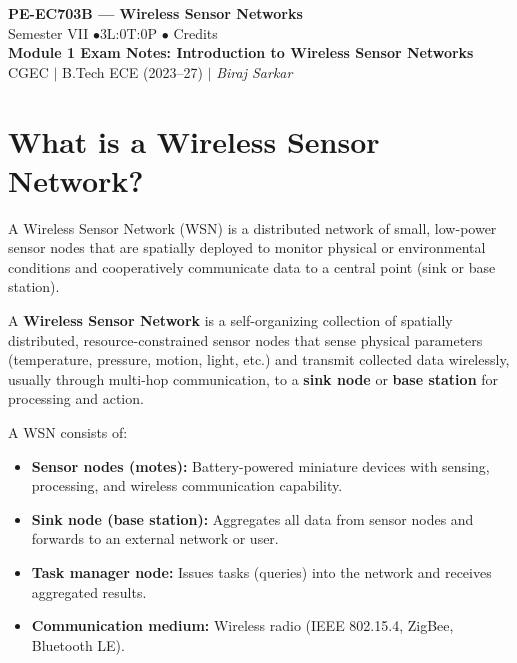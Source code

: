 \documentclass[12pt,a4paper]{article}
\begin{document}

\begin{center}
  {\LARGE\bfseries\color{myred} PE-EC703B --- Wireless Sensor Networks}\\[5pt]
  {\normalsize\color{mydark} Semester VII \quad$\bullet$\quad 3L:0T:0P \quad$\bullet$ Credits}\\[3pt]
  {\normalsize\color{myteal}\textbf{Module 1 Exam Notes: Introduction to Wireless Sensor Networks}}\\[3pt]
  {\small\color{mydark} CGEC \;$|$\; B.Tech ECE (2023--27) \;$|$\; \textit{Biraj Sarkar}}
\end{center}
\vspace{2pt}
\noindent{\color{myred}\rule{\linewidth}{1.5pt}}
\vspace{2pt}

\hypersetup{linkcolor=mydark}
\tableofcontents
\hypersetup{linkcolor=myteal}
\newpage

\section{What is a Wireless Sensor Network?}

A Wireless Sensor Network (WSN) is a distributed network of small, low-power sensor nodes that are spatially deployed to monitor physical or environmental conditions and cooperatively communicate data to a central point (sink or base station).

\begin{tcolorbox}[defbox, title={\textbf{Wireless Sensor Network (WSN) --- Definition}}]
A \textbf{Wireless Sensor Network} is a self-organizing collection of spatially distributed, resource-constrained sensor nodes that sense physical parameters (temperature, pressure, motion, light, etc.) and transmit collected data wirelessly, usually through multi-hop communication, to a \textbf{sink node} or \textbf{base station} for processing and action.
\end{tcolorbox}

A WSN consists of:
\begin{itemize}[leftmargin=*, itemsep=3pt]
  \item \textbf{Sensor nodes (motes):} Battery-powered miniature devices with sensing, processing, and wireless communication capability.
  \item \textbf{Sink node (base station):} Aggregates all data from sensor nodes and forwards to an external network or user.
  \item \textbf{Task manager node:} Issues tasks (queries) into the network and receives aggregated results.
  \item \textbf{Communication medium:} Wireless radio (IEEE 802.15.4, ZigBee, Bluetooth LE).
\end{itemize}
\end{document}
